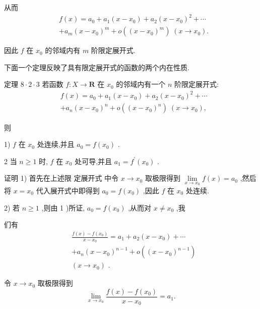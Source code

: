 从而
\begin{align*}
	&f\left( x\right)  = {a}_{0} + {a}_{1}\left( {x - {x}_{0}}\right)  + {a}_{2}{\left( x - {x}_{0}\right) }^{2} + \cdots\\
	&+ {a}_{m}{\left( x - {x}_{0}\right) }^{m} + o\left( {\left( x - {x}_{0}\right) }^{m}\right) \;\left( {x \rightarrow  {x}_{0}}\right) .
\end{align*}

因此 $f$ 在 ${x}_{0}$ 的邻域内有 $m$ 阶限定展开式.

下面一个定理反映了具有限定展开式的函数的两个内在性质.

定理 $8 \cdot  2 \cdot  3$ 若函数 $f : X \rightarrow  \mathbf{R}$ 在 ${x}_{0}$ 的邻域内有一个 $n$ 阶限定展开式:
\begin{align*}
	&f\left( x\right)  = {a}_{0} + {a}_{1}\left( {x - {x}_{0}}\right)  + {a}_{2}{\left( x - {x}_{0}\right) }^{2} + \cdots\\
	&+ {a}_{n}{\left( x - {x}_{0}\right) }^{n} + o\left( {\left( x - {x}_{0}\right) }^{n}\right) \;\left( {x \rightarrow  {x}_{0}}\right) ,
\end{align*}

则

1) $f$ 在 ${x}_{0}$ 处连续,并且 ${a}_{0} = f\left( {x}_{0}\right)$ .

2 当 $n \geq  1$ 时, $f$ 在 ${x}_{0}$ 处可导,并且 ${a}_{1} = {f}^{\prime }\left( {x}_{0}\right)$ .

证明 1) 首先在上述限 定展开式 中令 $x \rightarrow  {x}_{0}$ 取极限得到 $\mathop{\lim }\limits_{{x \rightarrow  {x}_{0}}}f\left( x\right)  = {a}_{0}$ ,然后将 $x = {x}_{0}$ 代入展开式中即得到 ${a}_{0} = f\left( {x}_{0}\right)$ ,因此 $f$ 在 ${x}_{0}$ 处连续.

2) 若 $n \geq  1$ ,则由 1 )所证, ${a}_{0} = f\left( {x}_{0}\right)$ ,从而对 $x \neq  {x}_{0}$ ,我

们有
\begin{align*}
	&\frac{f\left( x\right)  - f\left( {x}_{0}\right) }{x - {x}_{0}} = {a}_{1} + {a}_{2}\left( {x - {x}_{0}}\right)  + \cdots\\
	&+ {a}_{n}{\left( x - {x}_{0}\right) }^{n - 1} + o\left( {\left( x - {x}_{0}\right) }^{n - 1}\right)\\
	&\left( {x \rightarrow  {x}_{0}}\right) \text{ . }
\end{align*}

令 $x \rightarrow  {x}_{0}$ 取极限得到
$$\mathop{\lim }\limits_{{x \rightarrow  {x}_{0}}}\frac{f\left( x\right)  - f\left( {x}_{0}\right) }{x - {x}_{0}} = {a}_{1}.$$

